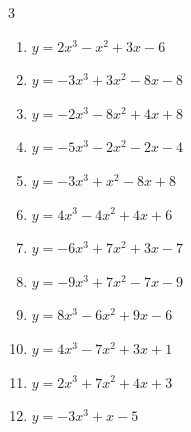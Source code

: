 \begin{multicols}{3}
\begin{enumerate}
\columnbreak %

\resetques

  \item $y=2x^{3}-x^{2}+3x-6$


  \item $y=-3x^{3}+3x^{2}-8x-8$


  \item $y=-2x^{3}-8x^{2}+4x+8$


  \item $y=-5x^{3}-2x^{2}-2x-4$


  \item $y=-3x^{3}+x^{2}-8x+8$


  \item $y=4x^{3}-4x^{2}+4x+6$


  \item $y=-6x^{3}+7x^{2}+3x-7$


  \item $y=-9x^{3}+7x^{2}-7x-9$


  \item $y=8x^{3}-6x^{2}+9x-6$


  \item $y=4x^{3}-7x^{2}+3x+1$


  \item $y=2x^{3}+7x^{2}+4x+3$


  \item $y=-3x^{3}+x-5$



\end{enumerate}
\end{multicols}
